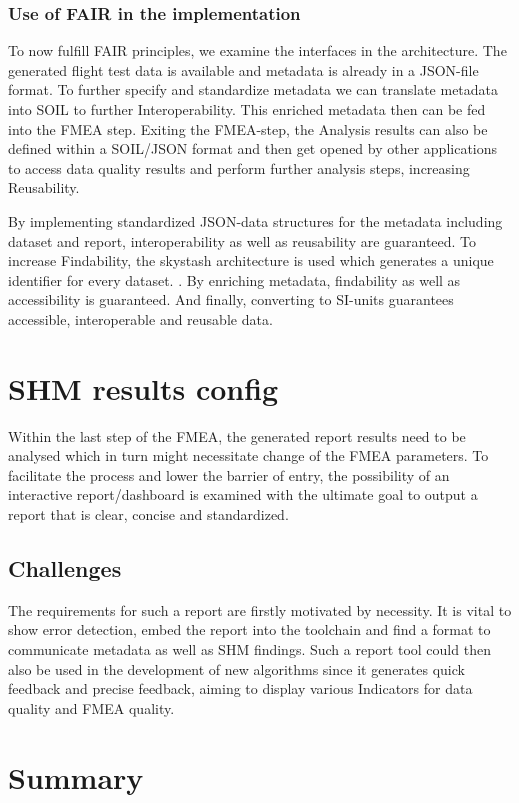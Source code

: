 
\subsubsection{Use of FAIR in the implementation}
To now fulfill FAIR principles, we examine the interfaces in the architecture. The generated flight test data is available and metadata is already in a JSON-file format. To further specify and standardize metadata we can translate metadata into SOIL to further Interoperability. This enriched metadata then can be fed into the FMEA step. Exiting the FMEA-step, the Analysis results can also be defined within a SOIL/JSON format and then get opened by other applications to access data quality results and perform further analysis steps, increasing Reusability.


By implementing standardized JSON-data structures for the metadata including dataset and report, interoperability as well as reusability are guaranteed. To increase Findability, the skystash architecture is used which generates a unique identifier for every dataset. \cite{meyer_development_2020}. By enriching metadata, findability as well as accessibility is guaranteed. And finally, converting to SI-units guarantees accessible, interoperable and reusable data.

\newpage


\section{SHM results config}

Within the last step of the FMEA, the generated report results need to be analysed which in turn might necessitate change of the FMEA parameters. To facilitate the process and lower the barrier of entry, the possibility of an interactive report/dashboard is examined with the ultimate goal to output a report that is clear, concise and standardized.

\subsection{Challenges}

The requirements for such a report are firstly motivated by necessity. It is vital to show error detection, embed the report into the toolchain and find a format to communicate metadata as well as SHM findings. Such a report tool could then also be used in the development of new algorithms since it generates quick feedback and precise feedback, aiming to display various Indicators for data quality and FMEA quality.


\section{Summary}




